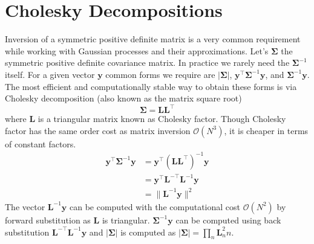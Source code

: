 \section{Cholesky Decompositions}
Inversion of a symmetric positive definite matrix is a very common requirement while working with Gaussian processes and their approximations. Let's $\boldsymbol{\Sigma}$ the symmetric positive definite covariance matrix. In practice we rarely need the $\boldsymbol{\Sigma}^{-1}$ itself. For a given vector $\textbf{y}$ common forms we require are $\left|\boldsymbol{\Sigma}\right|$,  $\textbf{y}^\top\boldsymbol{\Sigma}^{-1}\textbf{y}$, and $\boldsymbol{\Sigma}^{-1}\textbf{y}$. The most efficient and computationally stable way to obtain these forms is via Cholesky decomposition (also known as the matrix square root)
\begin{equation}\label{eq:Cholesky}
 \boldsymbol{\Sigma}=\textbf{L}\textbf{L}^\top
\end{equation}
where $\textbf{L}$ is a triangular matrix known as Cholesky factor. Though Cholesky factor has the same order cost as matrix inversion $\mathcal{O}\left(N^3\right)$, it is cheaper in terms of constant factors.
\begin{equation}\label{eq:Cholesky_dec}
\begin{split}
 \textbf{y}^\top\boldsymbol{\Sigma}^{-1}\textbf{y}
    &=\textbf{y}^\top\left(\textbf{L}\textbf{L}^\top\right)^{-1}\textbf{y}\\ 
    &=\textbf{y}^\top\textbf{L}^{-\top}\textbf{L}^{-1}\textbf{y}\\ 
    &=\parallel\textbf{L}^{-1}\textbf{y}\parallel^2
 \end{split}
\end{equation}
The vector $\textbf{L}^{-1}\textbf{y}$ can be computed with the computational cost $\mathcal{O}\left(N^2\right)$ by forward substitution as $\textbf{L}$ is triangular. $\boldsymbol{\Sigma}^{-1}\textbf{y}$ can be computed using back substitution $\textbf{L}^{-\top}\textbf{L}^{-1}\textbf{y}$ and $\left|\boldsymbol{\Sigma}\right|$ is computed as $\left|\boldsymbol{\Sigma}\right|=\prod_n \textbf{L}^{2}_nn$.

 

